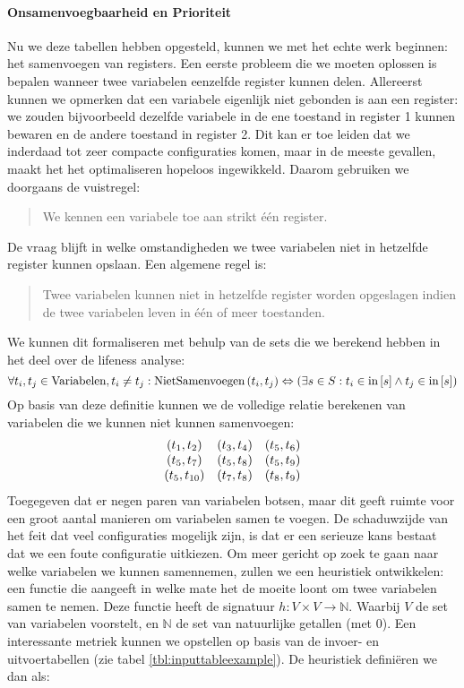 \paragraph{Onsamenvoegbaarheid en Prioriteit}
Nu we deze tabellen hebben opgesteld, kunnen we met het echte werk beginnen: het samenvoegen van registers. Een eerste probleem die we moeten oplossen is bepalen wanneer twee variabelen eenzelfde register kunnen delen. Allereerst kunnen we opmerken dat een variabele eigenlijk niet gebonden is aan een register: we zouden bijvoorbeeld dezelfde variabele in de ene toestand in register 1 kunnen bewaren en de andere toestand in register 2. Dit kan er toe leiden dat we inderdaad tot zeer compacte configuraties komen, maar in de meeste gevallen, maakt het het optimaliseren hopeloos ingewikkeld. Daarom gebruiken we doorgaans de vuistregel:
\begin{quote}
We kennen een variabele toe aan strikt \'e\'en register.
\end{quote}
De vraag blijft in welke omstandigheden we twee variabelen niet in hetzelfde register kunnen opslaan. Een algemene regel is:
\begin{quote}
Twee variabelen kunnen niet in hetzelfde register worden opgeslagen indien de twee variabelen leven in \'e\'en of meer toestanden.
\end{quote}
We kunnen dit formaliseren met behulp van de sets die we berekend hebben in het deel over de lifeness analyse:
\begin{equation}
\forall t_i,t_j\in\mbox{Variabelen}, t_i\neq t_j:\mbox{NietSamenvoegen}\left(t_i,t_j\right)\Leftrightarrow\left(\exists s\in S: t_i\in\mbox{in}\left[s\right]\wedge t_j\in\mbox{in}\left[s\right]\right)
\end{equation}
Op basis van deze definitie kunnen we de volledige relatie berekenen van variabelen die we kunnen niet kunnen samenvoegen:
\begin{equation}
\begin{array}{ccc}
\left( t_1,t_2 \right)&\left( t_3,t_4 \right)&\left( t_5,t_6 \right)\\
\left( t_5,t_7 \right)&\left( t_5,t_8 \right)&\left( t_5,t_9 \right)\\
\left( t_5,t_{10} \right)&\left( t_7,t_8 \right)&\left( t_8,t_9 \right)
\end{array}
\label{eqn:asmSqrtIncompatible}
\end{equation}
Toegegeven dat er negen paren van variabelen botsen, maar dit geeft ruimte voor een groot aantal manieren om variabelen samen te voegen. De schaduwzijde van het feit dat veel configuraties mogelijk zijn, is dat er een serieuze kans bestaat dat we een foute configuratie uitkiezen. Om meer gericht op zoek te gaan naar welke variabelen we kunnen samennemen, zullen we een heuristiek ontwikkelen: een functie die aangeeft in welke mate het de moeite loont om twee variabelen samen te nemen. Deze functie heeft de signatuur $h:V\times V\rightarrow\mathbb{N}$. Waarbij $V$ de set van variabelen voorstelt, en $\mathbb{N}$ de set van natuurlijke getallen (met 0). Een interessante metriek kunnen we opstellen op basis van de invoer- en uitvoertabellen (zie tabel \ref{tbl:inputtableexample}). De heuristiek defini\"eren we dan als:
